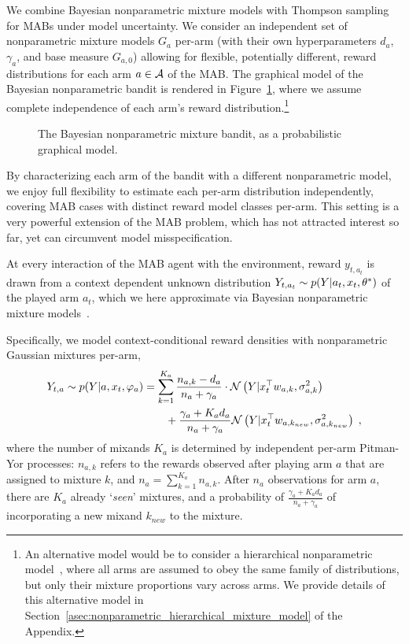 We combine Bayesian nonparametric mixture models with Thompson sampling for MABs under model uncertainty. We consider an independent set of nonparametric mixture models $G_{a}$ per-arm (with their own hyperparameters $d_a$,$\gamma_a$, and base measure $G_{a,0}$) allowing for flexible, potentially different, reward distributions for each arm $a\in\mathcal{A}$ of the MAB.
The graphical model of the Bayesian nonparametric bandit is rendered in Figure~\ref{fig:pgm_nonparametric_bandit}, where we assume complete independence of each arm's reward distribution.\footnote{An alternative model would be to consider a hierarchical nonparametric model~\citep{j-Teh2006,j-Teh2010}, where all arms are assumed to obey the same family of distributions, but only their mixture proportions vary across arms. We provide details of this alternative model in Section~\ref{asec:nonparametric_hierarchical_mixture_model} of the Appendix.}

\begin{figure}[!h]
	\begin{center}
			
		\caption{The Bayesian nonparametric mixture bandit, as a probabilistic graphical model.}
		\label{fig:pgm_nonparametric_bandit}
		\vspace*{-4ex}
	\end{center}
\end{figure}

By characterizing each arm of the bandit with a different nonparametric model, we enjoy full flexibility to estimate each per-arm distribution independently, covering MAB cases with distinct reward model classes per-arm. This setting is a very powerful extension of the MAB problem, which has not attracted interest so far, yet can circumvent model misspecification.

At every interaction of the MAB agent with the environment, reward $y_{t,a_t}$ is \iid drawn from a context dependent unknown distribution $Y_{t,a_t}\sim p(Y|a_t,x_t,\theta^*)$ of the played arm $a_t$, which we here approximate via Bayesian nonparametric mixture models~\citep{b-Ghosal2017}.

Specifically, we model context-conditional reward densities with nonparametric Gaussian mixtures per-arm, \ie
\begin{align}
Y_{t,a} \sim p(Y|a,x_t,\varphi_a) &= \sum_{k=1}^{K_a} \frac{n_{a,k}-d_a}{n_a+\gamma_a} \cdot \mathcal{N}\left( Y|x_{t}^\top w_{a,k}, \sigma_{a,k}^2\right) \nonumber \\
& \qquad + \frac{\gamma_a+K_ad_a}{n_a+\gamma_a} \mathcal{N}\left( Y|x_{t}^\top w_{a,k_{new}}, \sigma_{a,k_{new}}^2\right) \;,
\label{eq:nonparametric_Gaussian_mixture}
\end{align}
where the number of mixands $K_a$ is determined by independent per-arm Pitman-Yor processes: $n_{a,k}$ refers to the rewards observed after playing arm $a$ that are assigned to mixture $k$, and $n_a=\sum_{k=1}^{K_a}n_{a,k}$.
After $n_{a}$ observations for arm $a$, there are $K_a$ already `\textit{seen}' mixtures, and a probability of $\frac{\gamma_a+K_ad_a}{n_a+\gamma_a}$ of incorporating a new mixand $k_{new}$ to the mixture.

